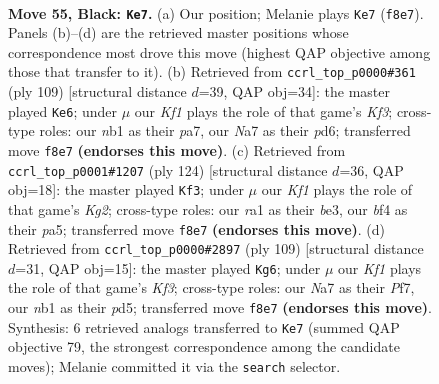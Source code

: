 \documentclass[11pt]{article}
\begin{document}
\clearpage

\begin{figure}[p]\centering
\begin{subfigure}{0.46\textwidth}\centering
\resizebox{\linewidth}{!}{%
\newchessgame
\chessboard[
  setfen={5k1K/n1P5/p7/P4p1p/4pB2/5bP1/8/RN1r4 b - - 17 55},
  showmover=false,
  pgfstyle=straightmove, color=movearrow, markmove={f8-e7}
]}
\caption{}
\end{subfigure}\hfill
\begin{subfigure}{0.46\textwidth}\centering
\resizebox{\linewidth}{!}{%
\newchessgame
\chessboard[
  setfen={r7/P2p4/2bP1k2/4p1p1/6Pp/3KB2P/R7/8 b - - 1 55},
  showmover=false,
  pgfstyle=straightmove, color=movearrow, markmove={f6-e6}
]}
\caption{}
\end{subfigure}
\\[4pt]
\begin{subfigure}{0.46\textwidth}\centering
\resizebox{\linewidth}{!}{%
\newchessgame
\chessboard[
  setfen={8/4r3/8/p1pR3P/2B2p1k/1P2b3/P5K1/8 w - - 5 63},
  showmover=false,
  pgfstyle=straightmove, color=movearrow, markmove={g2-f3}
]}
\caption{}
\end{subfigure}\hfill
\begin{subfigure}{0.46\textwidth}\centering
\resizebox{\linewidth}{!}{%
\newchessgame
\chessboard[
  setfen={3R4/5p2/5k1P/pB1P4/Pb4p1/6P1/3r4/5K2 b - - 0 55},
  showmover=false,
  pgfstyle=straightmove, color=movearrow, markmove={f6-g6}
]}
\caption{}
\end{subfigure}
\caption{\textbf{Move 55, Black: \texttt{Ke7}.} (a) Our position; Melanie plays \texttt{Ke7} (\texttt{f8e7}). Panels (b)--(d) are the retrieved master positions whose correspondence most drove this move (highest QAP objective among those that transfer to it). (b) Retrieved from \texttt{ccrl\_top\_p0000\#361} (ply 109) [structural distance $d$=39, QAP obj=34]: the master played \texttt{Ke6}; under $\mu$ our \emph{Kf1} plays the role of that game's \emph{Kf3}; cross-type roles: our \emph{n}b1 as their \emph{p}a7, our \emph{N}a7 as their \emph{p}d6; transferred move \texttt{f8e7} \textbf{(endorses this move)}. (c) Retrieved from \texttt{ccrl\_top\_p0001\#1207} (ply 124) [structural distance $d$=36, QAP obj=18]: the master played \texttt{Kf3}; under $\mu$ our \emph{Kf1} plays the role of that game's \emph{Kg2}; cross-type roles: our \emph{r}a1 as their \emph{b}e3, our \emph{b}f4 as their \emph{p}a5; transferred move \texttt{f8e7} \textbf{(endorses this move)}. (d) Retrieved from \texttt{ccrl\_top\_p0000\#2897} (ply 109) [structural distance $d$=31, QAP obj=15]: the master played \texttt{Kg6}; under $\mu$ our \emph{Kf1} plays the role of that game's \emph{Kf3}; cross-type roles: our \emph{N}a7 as their \emph{P}f7, our \emph{n}b1 as their \emph{p}d5; transferred move \texttt{f8e7} \textbf{(endorses this move)}. Synthesis: 6 retrieved analogs transferred to \texttt{Ke7} (summed QAP objective 79, the strongest correspondence among the candidate moves); Melanie committed it via the \texttt{search} selector.}
\label{fig:thought-m109}
\end{figure}
\end{document}
